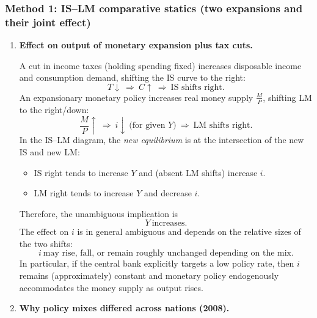 \documentclass[12pt]{article}
\begin{document}
\subsubsection*{Method 1: IS--LM comparative statics (two expansions and their joint effect)}
\begin{enumerate}[label=(\alph*)]
\item \textbf{Effect on output of monetary expansion plus tax cuts.}

A cut in income taxes (holding spending fixed) increases disposable income and consumption demand, shifting the IS curve to the right:
\[
T\downarrow \ \Longrightarrow\ C\uparrow \ \Longrightarrow\ \text{IS shifts right}.
\]
An expansionary monetary policy increases real money supply \(\frac{M}{P}\), shifting LM to the right/down:
\[
\frac{M}{P}\uparrow \ \Longrightarrow\ i\downarrow\ \text{(for given }Y)\ \Longrightarrow\ \text{LM shifts right}.
\]
In the IS--LM diagram, the \emph{new equilibrium} is at the intersection of the new IS and new LM:
\begin{itemize}[leftmargin=*]
  \item IS right tends to increase \(Y\) and (absent LM shifts) increase \(i\).
  \item LM right tends to increase \(Y\) and decrease \(i\).
\end{itemize}
Therefore, the unambiguous implication is
\[
\boxed{\,Y\ \text{increases.}\,}
\]
The effect on \(i\) is in general ambiguous and depends on the relative sizes of the two shifts:
\[
\boxed{\,i\ \text{may rise, fall, or remain roughly unchanged depending on the mix.}\,}
\]
In particular, if the central bank explicitly targets a low policy rate, then \(i\) remains (approximately) constant and monetary policy endogenously accommodates the money supply as output rises.

\item \textbf{Why policy mixes differed across nations (2008).}


\end{enumerate}
\end{document}
